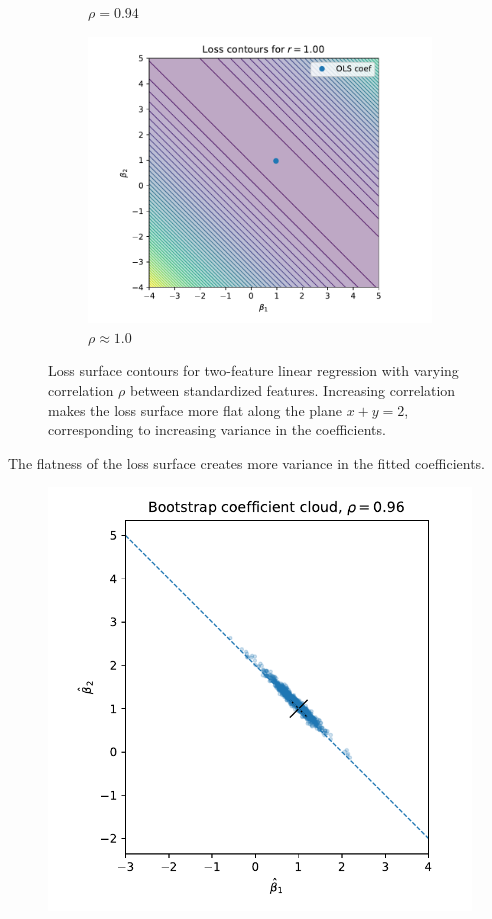 \begin{figure}[H]
\begin{subfigure}[b]{0.32\textwidth}
    \caption{$\rho = 0.94$}
    \label{fig:loss-contours-r94}
\end{subfigure}
\hfill
\begin{subfigure}[b]{0.32\textwidth}
    \centering
    \includegraphics[width=\textwidth]{images/loss_contours_r100-1.pdf}
    \caption{$\rho \approx 1.0$}
    \label{fig:loss-contours-r100}
\end{subfigure}
\caption{Loss surface contours for two-feature linear regression with varying correlation $\rho$ between standardized features. Increasing correlation makes the loss surface more flat along the plane $x+y=2$, corresponding to increasing variance in the coefficients.}
\label{fig:loss-contours-correlation}
\end{figure}

The flatness of the loss surface creates more variance in the fitted coefficients.

\begin{figure}[H]
\centering
\includegraphics[width=.5\textwidth]{images/bootstrap_coef_cloud.pdf}
\end{figure}



